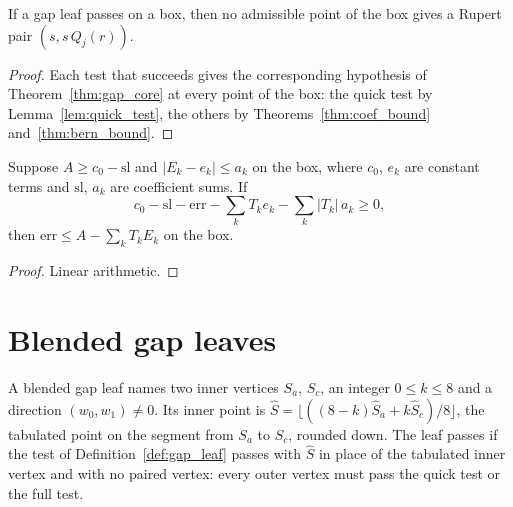 \begin{theorem}
\label{thm:gap_leaf_sound}
\leanok
{}
If a gap leaf passes on a box, then no admissible point of the box gives a Rupert pair
$(s, s\, Q_j(r))$.
\end{theorem}
\begin{proof}
\leanok
{}
Each test that succeeds gives the corresponding hypothesis of
Theorem~\ref{thm:gap_core} at every point of the box: the quick test by
Lemma~\ref{lem:quick_test}, the others by Theorems~\ref{thm:coef_bound}
and~\ref{thm:bern_bound}.
\end{proof}

\begin{lemma}
\label{lem:quick_test}
\leanok
{}
Suppose $A \ge c_0 - \mathrm{sl}$ and $|E_k - e_k| \le a_k$ on the box, where $c_0$, $e_k$
are constant terms and $\mathrm{sl}$, $a_k$ are coefficient sums. If
\[
  c_0 - \mathrm{sl} - \mathrm{err} - \sum_k T_k e_k - \sum_k |T_k|\, a_k \ge 0,
\]
then $\mathrm{err} \le A - \sum_k T_k E_k$ on the box.
\end{lemma}
\begin{proof}
\leanok
Linear arithmetic.
\end{proof}

\section{Blended gap leaves}

\begin{definition}
\label{def:blend_leaf}
\leanok
{}
A blended gap leaf names two inner vertices $S_a$, $S_c$, an integer $0 \le k \le 8$ and a
direction $(w_0, w_1) \ne 0$. Its inner point is
$\hat S = \lfloor ((8 - k) \hat S_a + k \hat S_c) / 8 \rfloor$, the tabulated point on the
segment from $S_a$ to $S_c$, rounded down. The leaf passes if the test of
Definition~\ref{def:gap_leaf} passes with $\hat S$ in place of the tabulated inner vertex
and with no paired vertex: every outer vertex must pass the quick test or the full test.
\end{definition}

